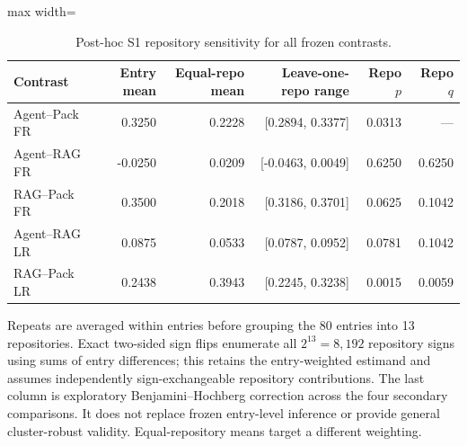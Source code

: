 \begin{table}[t]
\centering\small
\caption{Post-hoc S1 repository sensitivity for all frozen contrasts.}\label{tab:cluster-sensitivity}
\begin{adjustbox}{max width=\textwidth}\begin{tabular}{lrrrrr}
\toprule
Contrast & Entry mean & Equal-repo mean & Leave-one-repo range & Repo $p$ & Repo $q$ \\
\midrule
Agent--Pack FR & 0.3250 & 0.2228 & [0.2894, 0.3377] & 0.0313 & --- \\
Agent--RAG FR & -0.0250 & 0.0209 & [-0.0463, 0.0049] & 0.6250 & 0.6250 \\
RAG--Pack FR & 0.3500 & 0.2018 & [0.3186, 0.3701] & 0.0625 & 0.1042 \\
Agent--RAG LR & 0.0875 & 0.0533 & [0.0787, 0.0952] & 0.0781 & 0.1042 \\
RAG--Pack LR & 0.2438 & 0.3943 & [0.2245, 0.3238] & 0.0015 & 0.0059 \\
\bottomrule
\end{tabular}\end{adjustbox}
\par\vspace{3pt}\begin{minipage}{\textwidth}\footnotesize Repeats are averaged within entries before grouping the 80 entries into 13 repositories. Exact two-sided sign flips enumerate all $2^{13}=8{,}192$ repository signs using sums of entry differences; this retains the entry-weighted estimand and assumes independently sign-exchangeable repository contributions. The last column is exploratory Benjamini--Hochberg correction across the four secondary comparisons. It does not replace frozen entry-level inference or provide general cluster-robust validity. Equal-repository means target a different weighting.\end{minipage}
\end{table}
